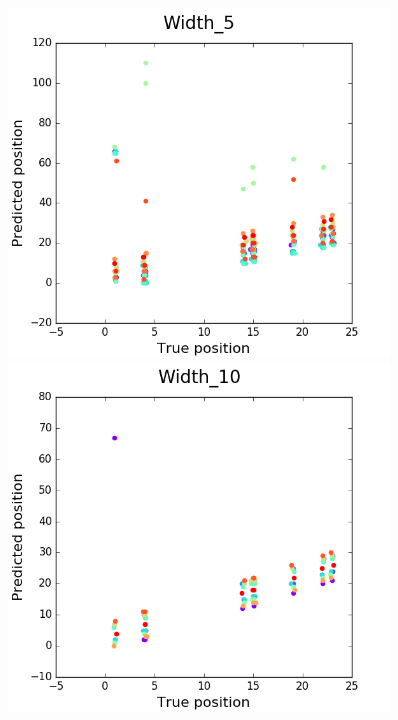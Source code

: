 \documentclass[11pt, oneside]{article}
\begin{document}
\begin{figure}[htbp]
  \centering
  \begin{minipage}{0.3\textwidth}
    \centering
    \includegraphics[width=0.9\textwidth]{images/Width_5} %
  \end{minipage}
  \hfill
  \begin{minipage}{0.3\textwidth}
    \centering
    \includegraphics[width=0.9\textwidth]{images/Width_10} %
  \end{minipage}

\end{figure}
\end{document}
